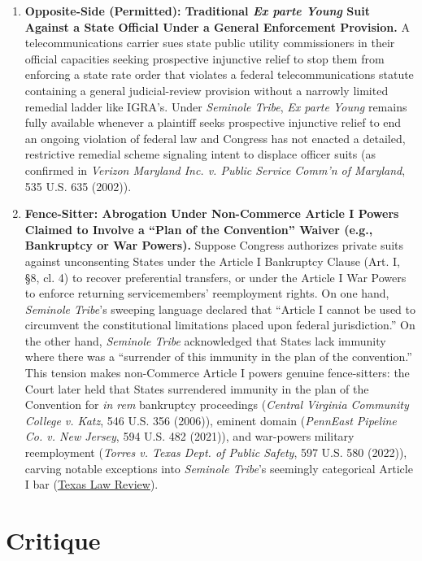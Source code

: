 \documentclass[12pt]{article}
\begin{document}
\begin{enumerate}
\item \textbf{Opposite-Side (Permitted): Traditional \textit{Ex parte Young} Suit Against a State Official Under a General Enforcement Provision.} A telecommunications carrier sues state public utility commissioners in their official capacities seeking prospective injunctive relief to stop them from enforcing a state rate order that violates a federal telecommunications statute containing a general judicial-review provision without a narrowly limited remedial ladder like IGRA's. Under \textit{Seminole Tribe}, \textit{Ex parte Young} remains fully available whenever a plaintiff seeks prospective injunctive relief to end an ongoing violation of federal law and Congress has not enacted a detailed, restrictive remedial scheme signaling intent to displace officer suits (as confirmed in \textit{Verizon Maryland Inc. v. Public Service Comm'n of Maryland}, 535 U.S. 635 (2002)).

\item \textbf{Fence-Sitter: Abrogation Under Non-Commerce Article I Powers Claimed to Involve a ``Plan of the Convention'' Waiver (e.g., Bankruptcy or War Powers).} Suppose Congress authorizes private suits against unconsenting States under the Article I Bankruptcy Clause (Art. I, \S 8, cl. 4) to recover preferential transfers, or under the Article I War Powers to enforce returning servicemembers' reemployment rights. On one hand, \textit{Seminole Tribe}'s sweeping language declared that ``Article I cannot be used to circumvent the constitutional limitations placed upon federal jurisdiction.'' On the other hand, \textit{Seminole Tribe} acknowledged that States lack immunity where there was a ``surrender of this immunity in the plan of the convention.'' This tension makes non-Commerce Article I powers genuine fence-sitters: the Court later held that States surrendered immunity in the plan of the Convention for \textit{in rem} bankruptcy proceedings (\textit{Central Virginia Community College v. Katz}, 546 U.S. 356 (2006)), eminent domain (\textit{PennEast Pipeline Co. v. New Jersey}, 594 U.S. 482 (2021)), and war-powers military reemployment (\textit{Torres v. Texas Dept. of Public Safety}, 597 U.S. 580 (2022)), carving notable exceptions into \textit{Seminole Tribe}'s seemingly categorical Article I bar (\href{https://texaslawreview.org/state-sovereign-immunity-after-the-revolution/}{Texas Law Review}).
\end{enumerate}

\section{Critique}
\end{document}
